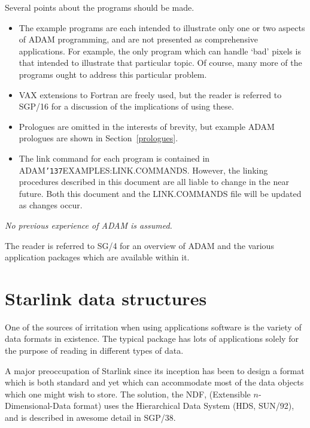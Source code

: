 \documentclass[twoside,11pt]{article}
\renewcommand{\_}{{\tt\char'137}}
\newcommand{\xref}[3]{#1}
\newcommand{\xlabel}[1]{}
\begin{document}
Several points about the programs should be made.
\begin{itemize}
\item The example programs are each intended to illustrate
only one or two aspects of ADAM programming, and are not presented as
comprehensive applications.
For example, the only program which can handle `bad' pixels is that intended
to illustrate that particular topic. Of course, many more of the programs 
ought to address this particular problem.

\item VAX extensions to Fortran are freely used, but the reader is referred to 
\xref{SGP/16}{sgp16}{} for a discussion of the implications of using these.

\item Prologues are omitted in the interests of brevity, but example ADAM 
prologues are shown in Section~\ref{prologues}.

\item The link command for each program is contained in 
ADAM\_EXAMPLES:LINK.COMMANDS. However, the linking procedures described in this 
document are all liable to change in the near future. Both this document and
the LINK.COMMANDS file will be updated as changes occur.

\end{itemize}

{\sl No previous experience of ADAM is assumed.}

The reader is referred to \xref{SG/4}{sg4}{} for an overview of ADAM and the
various application packages which are available within it.

\newpage
\section{Starlink data structures\label{ndf}\xlabel{starlink_data_structures}}

One of the sources of irritation when using applications software is the
variety of data formats in existence.
The typical package has lots of applications solely for the
purpose of reading in different types of data.

A major preoccupation of Starlink since its inception has been to 
design a format which
is both standard and yet which can accommodate most of the 
data objects which one might wish to store.
The solution,  the NDF, (Extensible $n$-Dimensional-Data format) uses
the Hierarchical Data System (HDS, \xref{SUN/92}{sun92}{}), and is described
in awesome detail in \xref{SGP/38}{sgp38}{}.
\end{document}
